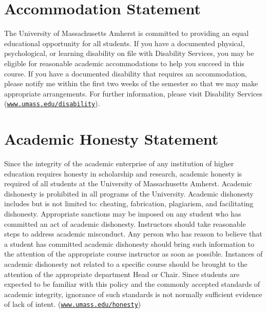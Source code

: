 \documentclass[11pt,letterpaper]{article}
\begin{document}
\section*{Accommodation Statement}

The University of Massachusetts Amherst is committed to providing an equal educational opportunity for all students. If you have a documented physical, psychological, or learning disability on file with Disability Services, you may be eligible for reasonable academic accommodations to help you succeed in this course. If you have a documented disability that requires an accommodation, please notify me within the first two weeks of the semester so that we may make appropriate arrangements. For further information, please visit Disability Services (\href{https://www.umass.edu/disability/}{\texttt{www.umass.edu/disability}}).

\section*{Academic Honesty Statement}

Since the integrity of the academic enterprise of any institution of higher education requires honesty in scholarship and research, academic honesty is required of all students at the University of Massachusetts Amherst. Academic dishonesty is prohibited in all programs of the University. Academic dishonesty includes but is not limited to: cheating, fabrication, plagiarism, and facilitating dishonesty. Appropriate sanctions may be imposed on any student who has committed an act of academic dishonesty. Instructors should take reasonable steps to address academic misconduct. Any person who has reason to believe that a student has committed academic dishonesty should bring such information to the attention of the appropriate course instructor as soon as possible. Instances of academic dishonesty not related to a specific course should be brought to the attention of the appropriate department Head or Chair. Since students are expected to be familiar with this policy and the commonly accepted standards of academic integrity, ignorance of such standards is not normally sufficient evidence of lack of intent. (\href{https://www.umass.edu/honesty/}{\texttt{www.umass.edu/honesty}})
\end{document}
